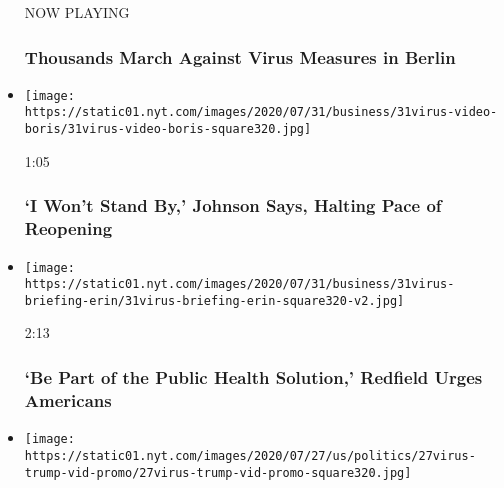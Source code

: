 \begin{itemize}
  NOW PLAYING

  \hypertarget{thousands-march-against-virus-measures-in-berlin-1}{%
  \subsubsection{Thousands March Against Virus Measures in
  Berlin}\label{thousands-march-against-virus-measures-in-berlin-1}}
\item
  \href{https://www.nytimes.com/video/us/politics/100000007266983/johnson-coronavirus-restrictions.html?action=click\&module=video-series-bar\&region=header\&pgtype=Article\&playlistId=video/coronavirus-news-update}{}

  \texttt{[image: https://static01.nyt.com/images/2020/07/31/business/31virus-video-boris/31virus-video-boris-square320.jpg]}

  1:05

  \hypertarget{i-wont-stand-by-johnson-says-halting-pace-of-reopening}{%
  \subsubsection{`I Won't Stand By,' Johnson Says, Halting Pace of
  Reopening}\label{i-wont-stand-by-johnson-says-halting-pace-of-reopening}}
\item
  \href{https://www.nytimes.com/video/us/politics/100000007266691/fauci-congress-testimony.html?action=click\&module=video-series-bar\&region=header\&pgtype=Article\&playlistId=video/coronavirus-news-update}{}

  \texttt{[image: https://static01.nyt.com/images/2020/07/31/business/31virus-briefing-erin/31virus-briefing-erin-square320-v2.jpg]}

  2:13

  \hypertarget{be-part-of-the-public-health-solution-redfield-urges-americans}{%
  \subsubsection{`Be Part of the Public Health Solution,' Redfield Urges
  Americans}\label{be-part-of-the-public-health-solution-redfield-urges-americans}}
\item
  \href{https://www.nytimes.com/video/us/100000007258794/trump-boasts-vaccine-progress-north-carolina.html?action=click\&module=video-series-bar\&region=header\&pgtype=Article\&playlistId=video/coronavirus-news-update}{}

  \texttt{[image: https://static01.nyt.com/images/2020/07/27/us/politics/27virus-trump-vid-promo/27virus-trump-vid-promo-square320.jpg]}


\end{itemize}
